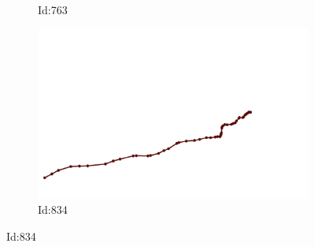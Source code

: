 \documentclass[12pt,twoside]{report}
\begin{document}
\begin{figure}
\begin{subfigure}[b]{0.20\textwidth}
\caption{Id:763}
\end{subfigure}
\begin{subfigure}[b]{0.20\textwidth}
\centering
\includegraphics[width=\textwidth]{../../trajectories/834.png}
\caption{Id:834}
\end{subfigure}
\end{figure}
\end{document}
